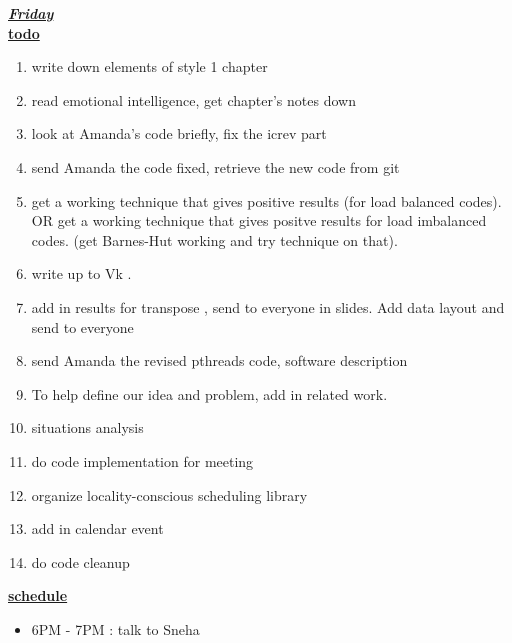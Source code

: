 \underline{\textbf{\textit{Friday}}}\\
\underline{\textbf{todo}}\\
\begin{enumerate}
\item write down elements of style 1 chapter 
\item read emotional intelligence, get chapter's notes down 

\item look at Amanda's code briefly, fix the icrev part    
\item send Amanda the code fixed, retrieve the new code from git

\item get a working technique that gives positive results (for load balanced codes). OR get a working technique that gives positve results for load imbalanced codes.    (get Barnes-Hut working and try technique on that).

\item write up to Vk .
\item add in results for transpose , send to everyone in slides. Add data layout and send to everyone  

\item send Amanda the revised pthreads code, software description 
\item To help define our idea and problem, add in related work.  

\item situations analysis 

\item do code implementation for meeting 
\item organize locality-conscious scheduling library 
\item add in calendar event 
\item do code cleanup 

\end{enumerate}

\underline{\textbf{schedule}}\\
\begin{itemize}
\item 6PM - 7PM : talk to Sneha
\end{itemize}

